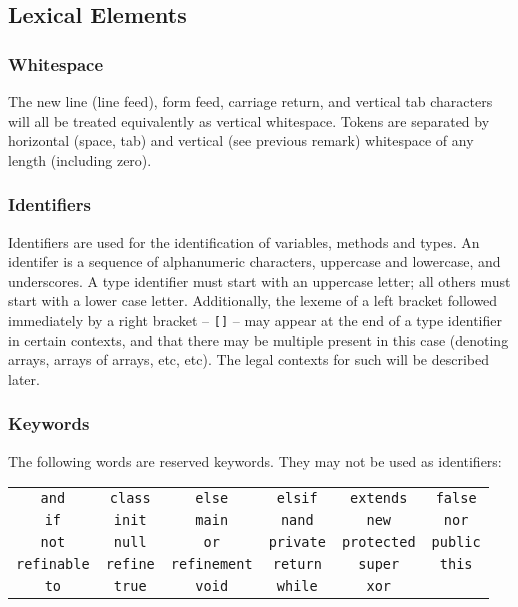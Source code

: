 \subsection{Lexical Elements}
\subsubsection{Whitespace}
The new line (line feed), form feed, carriage return, and vertical tab characters will all be treated equivalently as vertical whitespace. Tokens are separated by horizontal (space, tab) and vertical (see previous remark) whitespace of any length (including zero).

\subsubsection{Identifiers}
Identifiers are used for the identification of variables,  methods and types. An identifer is a sequence of alphanumeric characters, uppercase and lowercase, and underscores. A type identifier must start with an uppercase letter; all others must start with a lower case letter. Additionally, the lexeme of a left bracket followed immediately by a right bracket -- \verb![]! -- may appear at the end of a type identifier in certain contexts, and that there may be multiple present in this case (denoting arrays, arrays of arrays, etc, etc). The legal contexts for such will be described later.

\subsubsection{Keywords}
The following words are reserved keywords. They may not be used as identifiers:
\begin{center}
\begin{tabular}{cccccc}
\verb!and! & \verb!class! & \verb!else! & \verb!elsif! & \verb!extends! & \verb!false!\\
\verb!if! & \verb!init! & \verb!main! & \verb!nand! & \verb!new! & \verb!nor!\\
\verb!not! & \verb!null! & \verb!or! & \verb!private! & \verb!protected! & \verb!public!\\
\verb!refinable! & \verb!refine! & \verb!refinement! & \verb!return! & \verb!super! & \verb!this!\\
\verb!to! & \verb!true! & \verb!void! & \verb!while! & \verb!xor!\\
\end{tabular}
\end{center}

